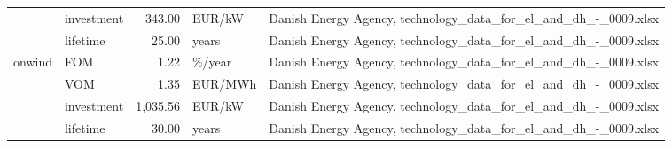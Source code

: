 \begin{longtable}{p{5cm}p{3cm}rp{3cm}p{11cm}}
                      & investment &         343.00 &                            EUR/kW &                                                                                                                                                                                                                                                                      Danish Energy Agency, technology\_data\_for\_el\_and\_dh\_-\_0009.xlsx \\
                      & lifetime &          25.00 &                             years &                                                                                                                                                                                                                                                                      Danish Energy Agency, technology\_data\_for\_el\_and\_dh\_-\_0009.xlsx \\
onwind & FOM &           1.22 &                            \%/year &                                                                                                                                                                                                                                                                      Danish Energy Agency, technology\_data\_for\_el\_and\_dh\_-\_0009.xlsx \\
                      & VOM &           1.35 &                           EUR/MWh &                                                                                                                                                                                                                                                                      Danish Energy Agency, technology\_data\_for\_el\_and\_dh\_-\_0009.xlsx \\
                      & investment &       1,035.56 &                            EUR/kW &                                                                                                                                                                                                                                                                      Danish Energy Agency, technology\_data\_for\_el\_and\_dh\_-\_0009.xlsx \\
                      & lifetime &          30.00 &                             years &                                                                                                                                                                                                                                                                      Danish Energy Agency, technology\_data\_for\_el\_and\_dh\_-\_0009.xlsx \\

\end{longtable}
